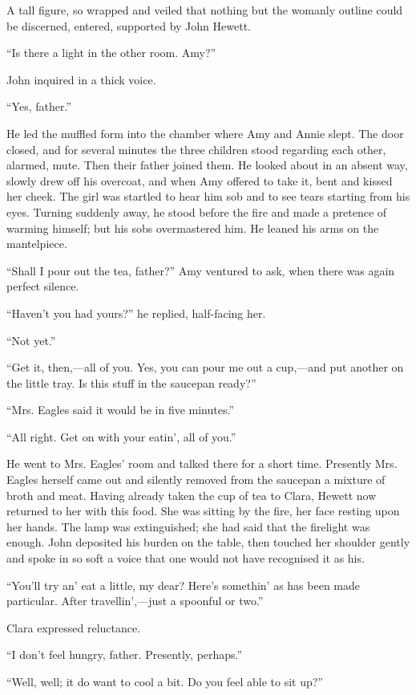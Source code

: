 {}A tall figure, so wrapped and veiled that nothing but the womanly
outline could be discerned, entered, supported by John Hewett.

``Is there a light in the other room. Amy?''

John inquired in a thick voice.

``Yes, father.''

He led the muffled form into the chamber where Amy and Annie slept. The
door closed, and for several minutes the three children stood regarding
each other, alarmed, mute. Then their father joined them. He looked
about in an absent way, slowly drew off his overcoat, and when Amy
offered to take it, bent and kissed her cheek. The girl was startled to
hear him sob and to see tears starting from his eyes. Turning suddenly
away, he stood before the fire and made a pretence of warming himself;
but his sobs overmastered him. He leaned his arms on the mantelpiece.

``Shall I pour out the tea, father?'' Amy ventured to ask, when there
was again perfect silence.

{}``Haven't you had yours?'' he replied, half-facing her.

``Not yet.''

``Get it, then,---all of you. Yes, you can pour me out a cup,---and put
another on the little tray. Is this stuff in the saucepan ready?''

``Mrs. Eagles said it would be in five minutes.''

``All right. Get on with your eatin', all of you.''

He went to Mrs. Eagles' room and talked there for a short time.
Presently Mrs. Eagles herself came out and silently removed from the
saucepan a mixture of broth and meat. Having already taken the cup of
tea to Clara, Hewett now returned to her with this food. She was sitting
by the fire, her face resting upon her hands. The lamp was extinguished;
she had said that the firelight was enough. John deposited his burden on
the table, then touched her shoulder gently and spoke in so soft a voice
that one would not have recognised it as his.

{}``You'll try an' eat a little, my dear? Here's somethin' as has been
made particular. After travellin',---just a spoonful or two.''

Clara expressed reluctance.

``I don't feel hungry, father. Presently, perhaps.''

``Well, well; it do want to cool a bit. Do you feel able to sit up?''

